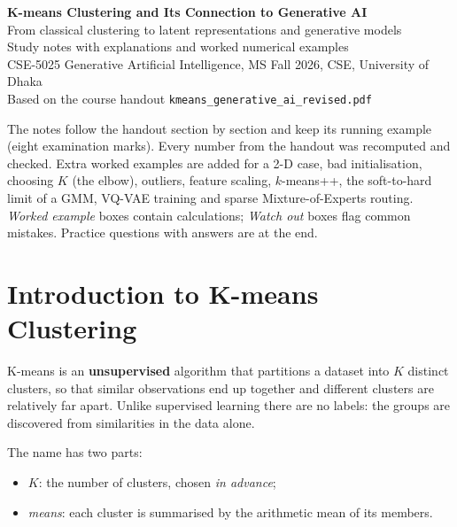 \documentclass[11pt,a4paper]{article}
\begin{document}
\begin{center}
{\LARGE\bfseries K-means Clustering and Its Connection to Generative AI}\\[6pt]
{\large From classical clustering to latent representations and generative models}\\[6pt]
Study notes with explanations and worked numerical examples\\
CSE-5025 Generative Artificial Intelligence, MS Fall 2026, CSE, University of Dhaka\\
Based on the course handout \texttt{kmeans\_generative\_ai\_revised.pdf}
\end{center}

\begin{keyidea}
The notes follow the handout section by section and keep its running example (eight examination marks). Every number from the handout was recomputed and checked. Extra worked examples are added for a 2-D case, bad initialisation, choosing $K$ (the elbow), outliers, feature scaling, $k$-means++, the soft-to-hard limit of a GMM, VQ-VAE training and sparse Mixture-of-Experts routing. \emph{Worked example} boxes contain calculations; \emph{Watch out} boxes flag common mistakes. Practice questions with answers are at the end.
\end{keyidea}

\tableofcontents
\newpage

\section{Introduction to K-means Clustering}

K-means is an \textbf{unsupervised} algorithm that partitions a dataset into $K$ distinct clusters, so that similar observations end up together and different clusters are relatively far apart. Unlike supervised learning there are no labels: the groups are discovered from similarities in the data alone.

The name has two parts:
\begin{itemize}[nosep]
\item $K$: the number of clusters, chosen \emph{in advance};
\item \emph{means}: each cluster is summarised by the arithmetic mean of its members.
\end{itemize}
\end{document}
